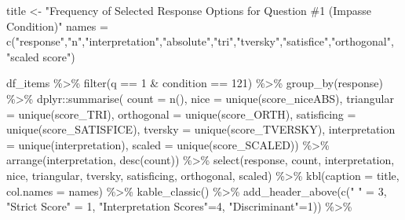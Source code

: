 \documentclass[
  letterpaper,
  DIV=11,
  numbers=noendperiod]{scrreprt}
\newenvironment{Shaded}{\begin{snugshade}}{\end{snugshade}}
\newcommand{\AttributeTok}[1]{\textcolor[rgb]{0.40,0.45,0.13}{#1}}
\newcommand{\DecValTok}[1]{\textcolor[rgb]{0.68,0.00,0.00}{#1}}
\newcommand{\FunctionTok}[1]{\textcolor[rgb]{0.28,0.35,0.67}{#1}}
\newcommand{\NormalTok}[1]{\textcolor[rgb]{0.00,0.23,0.31}{#1}}
\newcommand{\OtherTok}[1]{\textcolor[rgb]{0.00,0.23,0.31}{#1}}
\newcommand{\SpecialCharTok}[1]{\textcolor[rgb]{0.37,0.37,0.37}{#1}}
\newcommand{\StringTok}[1]{\textcolor[rgb]{0.13,0.47,0.30}{#1}}
\begin{document}
\begin{Shaded}
\begin{Highlighting}[]
\NormalTok{title }\OtherTok{\textless{}{-}} \StringTok{"Frequency of Selected Response Options for Question \#1 (Impasse Condition)"}
\NormalTok{names }\OtherTok{=} \FunctionTok{c}\NormalTok{(}\StringTok{"response"}\NormalTok{,}\StringTok{"n"}\NormalTok{,}\StringTok{"interpretation"}\NormalTok{,}\StringTok{"absolute"}\NormalTok{,}\StringTok{"tri"}\NormalTok{,}\StringTok{"tversky"}\NormalTok{,}\StringTok{"satisfice"}\NormalTok{,}\StringTok{"orthogonal"}\NormalTok{, }\StringTok{"scaled score"}\NormalTok{)}

\NormalTok{df\_items }\SpecialCharTok{\%\textgreater{}\%} \FunctionTok{filter}\NormalTok{(q }\SpecialCharTok{==} \DecValTok{1} \SpecialCharTok{\&}\NormalTok{ condition }\SpecialCharTok{==} \DecValTok{121}\NormalTok{) }\SpecialCharTok{\%\textgreater{}\%} \FunctionTok{group\_by}\NormalTok{(response) }\SpecialCharTok{\%\textgreater{}\%} 
\NormalTok{  dplyr}\SpecialCharTok{::}\FunctionTok{summarise}\NormalTok{( }\AttributeTok{count =} \FunctionTok{n}\NormalTok{(), }
                    \AttributeTok{nice =} \FunctionTok{unique}\NormalTok{(score\_niceABS),}
                    \AttributeTok{triangular =} \FunctionTok{unique}\NormalTok{(score\_TRI), }
                    \AttributeTok{orthogonal =}  \FunctionTok{unique}\NormalTok{(score\_ORTH),}
                    \AttributeTok{satisficing =}  \FunctionTok{unique}\NormalTok{(score\_SATISFICE),}
                    \AttributeTok{tversky =} \FunctionTok{unique}\NormalTok{(score\_TVERSKY),}
                    \AttributeTok{interpretation =} \FunctionTok{unique}\NormalTok{(interpretation),}
                    \AttributeTok{scaled =} \FunctionTok{unique}\NormalTok{(score\_SCALED)) }\SpecialCharTok{\%\textgreater{}\%} 
  \FunctionTok{arrange}\NormalTok{(interpretation, }\FunctionTok{desc}\NormalTok{(count)) }\SpecialCharTok{\%\textgreater{}\%} 
  \FunctionTok{select}\NormalTok{(response, count, interpretation, nice, }
\NormalTok{         triangular, tversky, satisficing, orthogonal, scaled) }\SpecialCharTok{\%\textgreater{}\%} 
  \FunctionTok{kbl}\NormalTok{(}\AttributeTok{caption =}\NormalTok{ title, }\AttributeTok{col.names =}\NormalTok{ names) }\SpecialCharTok{\%\textgreater{}\%}  \FunctionTok{kable\_classic}\NormalTok{() }\SpecialCharTok{\%\textgreater{}\%} 
  \FunctionTok{add\_header\_above}\NormalTok{(}\FunctionTok{c}\NormalTok{(}\StringTok{" "} \OtherTok{=} \DecValTok{3}\NormalTok{, }\StringTok{"Strict Score"} \OtherTok{=} \DecValTok{1}\NormalTok{, }\StringTok{"Interpretation Scores"}\OtherTok{=}\DecValTok{4}\NormalTok{, }\StringTok{"Discriminant"}\OtherTok{=}\DecValTok{1}\NormalTok{)) }\SpecialCharTok{\%\textgreater{}\%}

\end{Highlighting}
\end{Shaded}
\end{document}
